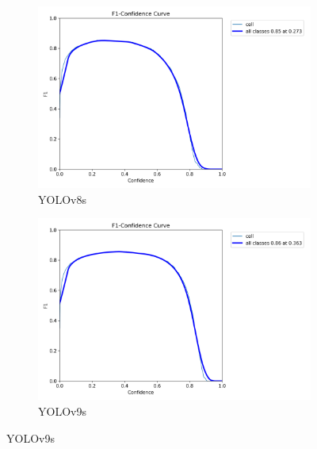 \documentclass[12pt,a4paper,onecolumn,oneside]{report}
\begin{document}
\begin{figure}[H]
  \centering
  \begin{subfigure}[b]{0.48\textwidth}
    \centering
    \includegraphics[width=\textwidth]{figuras/resultados experimentacion/yolov8s/test3/BoxF1_curve.png}
    \caption{YOLOv8s}
    \label{fig:yolov8s_test3}
  \end{subfigure}
  \hfill
  \begin{subfigure}[b]{0.48\textwidth}
    \centering
    \includegraphics[width=\textwidth]{figuras/resultados experimentacion/yolov9s/test3/BoxF1_curve.png}
    \caption{YOLOv9s}
    \label{fig:yolov9s_test3}
  \end{subfigure}
  

\end{figure}
\end{document}

